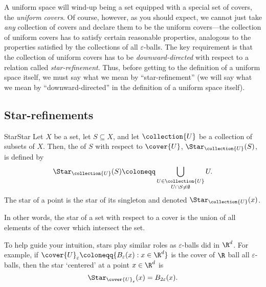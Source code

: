 A uniform space will wind-up being a set equipped with a special set of covers, the \emph{uniform covers}.  Of course, however, as you should expect, we cannot just take \emph{any} collection of covers and declare them to be the uniform covers---the collection of uniform covers has to satisfy certain reasonable properties, analogous to the properties satisfied by the collections of all $\varepsilon$-balls.  The key requirement is that the collection of uniform covers has to be \emph{downward-directed} with respect to a relation called \emph{star-refinement}.  Thus, before getting to the definition of a uniform space itself, we must say what we mean by ``star-refinement'' (we will say what we mean by ``downward-directed'' in the definition of a uniform space itself).

\subsection{Star-refinements}

\begin{dfn}{Star}{Star}
Let $X$ be a set, let $S\subseteq X$, and let $\collection{U}$ be a collection of subsets of $X$.  Then, the  of $S$ with respect to $\cover{U}$, $\Star _{\collection{U}}(S)$, is defined by
\begin{equation}
\Star _{\collection{U}}(S)\coloneqq \bigcup _{\substack{U\in \collection{U} \\ U\cap S\neq \emptyset}}U.
\end{equation}
The star of a point is the star of its singleton and denoted $\Star _{\collection{U}}(x)$.
\begin{rmk}
In other words, the star of a set with respect to a cover is the union of all elements of the cover which intersect the set.
\end{rmk}
\end{dfn}
To help guide your intuition, stars play similar roles as $\varepsilon$-balls did in $\R ^d$.  For example, if $\cover{U}_{\varepsilon}\coloneqq \{ B_{\varepsilon}(x):x\in \R ^d\}$ is the cover of $\R$ ball all $\varepsilon$-balls, then the star `centered' at a point $x\in \R ^d$ is
\begin{equation}
\Star _{\cover{U}_{\varepsilon}}(x)=B_{2\varepsilon}(x).
\end{equation}

